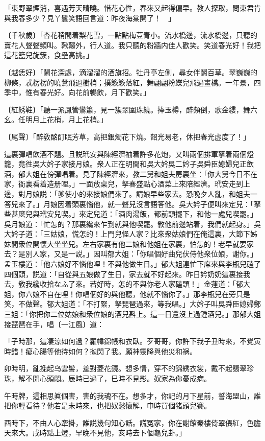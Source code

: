 \begin{myquote}
「東野翠煙消，喜遇芳天晴曉。惜花心性，春來又起得偏早。教人探取，問東君肯與我春多少？見丫鬟笑語回言道：昨夜海棠開了！　」

{\markfont〔千秋歲〕}「杏花稍間着梨花雪，一點點梅荳青小。流水橋邊，流水橋邊，只聽的賣花人聲聲頻叫。鞦韆外，行人道。我只聽的粉牆内佳人歡笑。笑道春光好！我把這花籃兒旋簇，食壘高挑。」

{\markfont〔越恁好〕}「鬧花深處，滴溜溜的酒旗招。牡丹亭左側，尋女伴鬬百草。翠巍巍的柳條，忒楞楞的曉鶯飛過樹梢；撲簌簌落紅，舞翩翩粉蝶兒飛過畫橋。一年景，四季中，惟有春光好。向花前暢飲，月下歡笑。」

{\markfont〔紅綉鞋〕}「聽一派鳳管鸞簫，見一簇翠圍珠繞。捧玉樽，醉頻倒，歌金縷，舞六幺。任明月上花梢，月上花梢。」

{\markfont〔尾聲〕}「醉敎酩酊眠芳草，高把銀燭花下燒。韶光易老，休把春光虚度了！」
\end{myquote}

這裏彈唱飲酒不題。且説玳安與陳經濟袖着許多花炮，又叫兩個排軍拏着兩個燈籠，竟徃吳大妗子家接月娘。衆人正在明間和吳大妗吳二妗子吳舜臣媳婦兒正飲酒，郁大姐在傍彈唱着。見了陳經濟來，教二舅和姐夫房裏坐：「你大舅今日不在家，衙裏看着造册哩。」一面放桌兒，拏春盛點心酒菜上來陪經濟。玳安走到上邊，對月娘説：「爹使小的來接娘們來了。請娘早些家去。恐晚夕人亂，和姐夫一答兒來了。」月娘因着頭裏惱他，就一聲兒沒言語答他。吳大妗子便叫來定兒：「拏些甚麽兒與玳安兒喫。」來定兒道：「酒肉湯飯，都前頭擺下，和他一處兒喫罷。」吳月娘道：「忙怎的？那裏纔來乍到就與他喫罷。敎他前邊站着，我們就起身。」吳大妗子道：「三姑娘，慌怎的！上門兒怪人家？比來衆姑娘們在俺這裏，大節下姊妹間衆位開懷大坐坐兒。左右家裏有他二娘和他姐在家裏，怕怎的！老早就要家去？是別人家，又是一説。」因叫郁大姐：「你唱個好曲兒伏侍他衆位娘，謝你。」孟玉樓道：「他六娘好不惱他哩！不與他做生日。」郁大姐連忙下席來與李瓶兒磕了四個頭，説道：「自從與五娘做了生日，家去就不好起來。昨日妗奶奶這裏接我去，敎我纔收拾なふ了來。若好時，怎的不與你老人家磕頭！」金蓮道：「郁大姐，你六娘不自在哩！你唱個好的與他聽，他就不惱你了。」那李瓶兒在旁只是笑，不做聲。郁大姐道：「不打緊，拏琵琶過來，等我唱。」大妗子叫吳舜臣媳婦鄭三姐：「你把你二位姑娘和衆位娘的酒兒斟上。這一日還沒上過鍾酒兒。」那郁大姐接琵琶在手，唱〔一江風〕道：

\begin{myquote}
「子時那，這凄涼如何過？羅幃錦帳和衣臥。歹哥哥，你許下我子丑時來，不覺寅時錯！癡心腸等他待如何？抛閃了我。願神靈降與他災和祸。

卯時明，亂挽起乌雲髻，羞對菱花鏡。想多情，穿不的錦綉衣裳，戴不起翡翠珍珠，解不開心頭悶。辰時已過了，巳時不見影。奴家為你憂成病。

午時牌，這相思眞個害，害的我魂不在。想多才，你記的月下星前，誓海盟山，誰把你輕看待？他若是未時來，也把奴愁懷解，申時買個猪頭兒賽。

酉時下，不由人心牽掛，誰説幾句知心話。謊冤家，你在謝館秦樓倚翠偎紅，色膽天來大。戌時點上燈，早晚不見他，亥時去卜個龜兒卦。」
\end{myquote}

